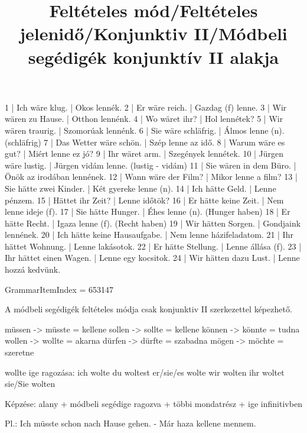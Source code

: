 \begin{exmp}
1 | Ich wäre klug. | Okos lennék.
2 | Er wäre reich. | Gazdag (f) lenne.
3 | Wir wären zu Hause. | Otthon lennénk.
4 | Wo wäret ihr? | Hol lennétek?
5 | Wir wären traurig. | Szomorúak lennénk.
6 | Sie wäre schläfrig. | Álmos lenne (n). (schläfrig)
7 | Das Wetter wäre schön. | Szép lenne az idő.
8 | Warum wäre es gut? | Miért lenne ez jó?
9 | Ihr wäret arm. | Szegények lennétek.
10 | Jürgen wäre lustig. | Jürgen vidám lenne. (lustig - vidám)
11 | Sie wären in dem Büro. | Önök az irodában lennének.
12 | Wann wäre der Film? | Mikor lenne a film?
13 | Sie hätte zwei Kinder. | Két gyereke lenne (n).
14 | Ich hätte Geld. | Lenne pénzem.
15 | Hättet ihr Zeit? | Lenne időtök?
16 | Er hätte keine Zeit. | Nem lenne ideje (f).
17 | Sie hätte Hunger. | Éhes lenne (n). (Hunger haben)
18 | Er hätte Recht. | Igaza lenne (f). (Recht haben)
19 | Wir hätten Sorgen. | Gondjaink lennének.
20 | Ich hätte keine Hausaufgabe. | Nem lenne házifeladatom.
21 | Ihr hättet Wohnung. | Lenne lakásotok.
22 | Er hätte Stellung. | Lenne állása (f).
23 | Ihr hättet einen Wagen. | Lenne egy kocsitok.
24 | Wir hätten dazu Lust. | Lenne hozzá kedvünk.
\end{exmp}

\title{Feltételes mód/Feltételes jelenidő/Konjunktiv II/Módbeli segédigék konjunktív II alakja}

GrammarItemIndex = 653147

\begin{desc}
A módbeli segédigék feltételes módja csak konjunktiv II szerkezettel képezhető.

müssen -> müsste = kellene
sollen -> sollte = kellene
können -> könnte = tudna
wollen -> wollte = akarna
dürfen -> dürfte = szabadna
mögen -> möchte = szeretne

wollte ige ragozása:
ich wolte
du woltest
er/sie/es wolte
wir wolten
ihr woltet
sie/Sie wolten

Képzése: alany + módbeli segédige ragozva + többi mondatrész + ige infinitivben

Pl.: Ich müsste schon nach Hause gehen. - Már haza kellene mennem.
\end{desc}

